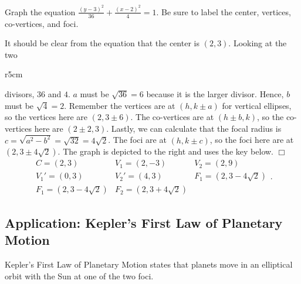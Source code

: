 \documentclass[../book.tex]{subfiles}
\begin{document}
\begin{example}
Graph the equation $\frac{(y-3)^2}{36} + \frac{(x-2)^2}{4} = 1$.  Be sure to label the center, vertices, co-vertices, and foci.
\end{example}
\begin{solution}
It should be clear from the equation that the center is $(2,3)$.  Looking at the two
\end{solution}

\begin{wrapfigure}{r}{5cm}
\end{wrapfigure}

\noindent divisors, $36$ and $4$.  $a$ must be $\sqrt{36}=6$ because it is the larger divisor.  Hence, $b$ must be $\sqrt{4}=2$.  Remember the vertices are at $(h,k \pm a)$ for vertical ellipses, so the vertices here are $(2,3 \pm 6)$.  The co-vertices are at $(h \pm b, k)$, so the co-vertices here are $(2 \pm 2,3)$.  Lastly, we can calculate that the focal radius is $c=\sqrt{a^2-b^2}=\sqrt{32} = 4\sqrt2$.  The foci are at $(h,k \pm c)$, so the foci here are at $(2,3\pm 4\sqrt2)$.  The graph is depicted to the right and uses the key below. $\Box$
$$\begin{matrix} C=(2,3) & V_1=(2,-3) & V_2=(2,9) \\ V_1'=(0,3) & V_2'=(4,3) & F_1=(2,3-4\sqrt{2}) \\ F_1=(2,3-4\sqrt{2}) & F_2=(2,3+4\sqrt{2}) \end{matrix}.$$

\subsection{Application: Kepler's First Law of Planetary Motion}
\noindent Kepler's First Law of Planetary Motion states that planets move in an elliptical orbit with the Sun at one of the two foci.
\end{document}
